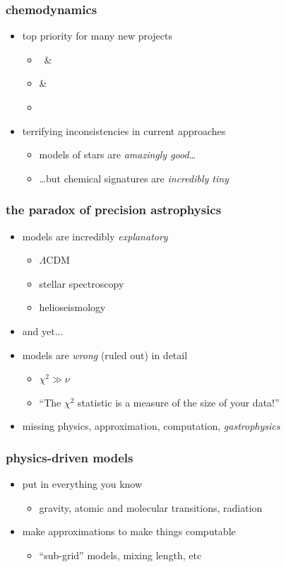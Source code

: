 \documentclass[pdftex]{beamer}
\begin{document}
\begin{frame}
  \frametitle{chemodynamics}
  \begin{itemize}
  \item top priority for many new projects
    \begin{itemize}
    \item \gaia\ \& 
    \item {} \& 
    \item \sdssiii\ \apogee
    \end{itemize}
  \item terrifying inconsistencies in current approaches
    \begin{itemize}
    \item models of stars are \emph{amazingly good}\ldots
    \item \ldots but chemical signatures are \emph{incredibly tiny}
    \end{itemize}
  \end{itemize}
\end{frame}

\begin{frame}
  \frametitle{the paradox of precision astrophysics}
  \begin{itemize}
  \item models are incredibly \emph{explanatory}
    \begin{itemize}
    \item $\Lambda$CDM
    \item stellar spectroscopy
    \item helioseismology
    \end{itemize}
  \item and yet...
  \item<2-> models are \emph{wrong} (ruled out) in detail
    \begin{itemize}
    \item $\chi^2 \gg \nu$
    \item ``The $\chi^2$ statistic is a measure of the size of your data!''
    \end{itemize}
  \item<2-> missing physics, approximation, computation, \emph{gastrophysics}
  \end{itemize}
\end{frame}

\begin{frame}
  \frametitle{physics-driven models}
  \begin{itemize}
  \item put in everything you know
    \begin{itemize}
    \item gravity, atomic and molecular transitions, radiation
    \end{itemize}
  \item make approximations to make things computable
    \begin{itemize}
    \item ``sub-grid'' models, mixing length, etc
    \end{itemize}
  \end{itemize}
\end{frame}
\end{document}
